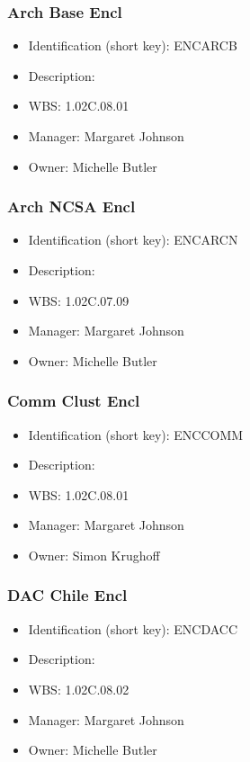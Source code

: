 \subsubsection{Arch Base Encl}\label{sect:ENCARCB}
\begin{itemize}
\item Identification (short key): ENCARCB
\item Description: 
\item WBS: 1.02C.08.01
\item Manager: Margaret Johnson
\item Owner: Michelle Butler
\end{itemize}

\subsubsection{Arch NCSA Encl}\label{sect:ENCARCN}
\begin{itemize}
\item Identification (short key): ENCARCN
\item Description: 
\item WBS: 1.02C.07.09
\item Manager: Margaret Johnson
\item Owner: Michelle Butler
\end{itemize}

\subsubsection{Comm Clust Encl}\label{sect:ENCCOMM}
\begin{itemize}
\item Identification (short key): ENCCOMM
\item Description: 
\item WBS: 1.02C.08.01
\item Manager: Margaret Johnson
\item Owner: Simon Krughoff
\end{itemize}

\subsubsection{DAC Chile Encl}\label{sect:ENCDACC}
\begin{itemize}
\item Identification (short key): ENCDACC
\item Description: 
\item WBS: 1.02C.08.02
\item Manager: Margaret Johnson
\item Owner: Michelle Butler
\end{itemize}

